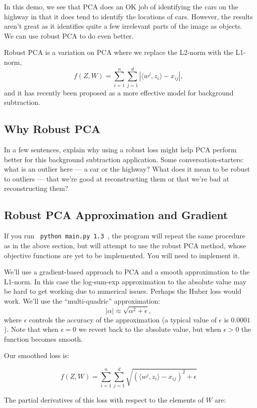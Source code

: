 \documentclass{article}
\newcommand{\blu}[1]{{\textcolor{blu}{#1}}}
\let\ask\blu
\begin{document}
In this demo, we see that PCA does an OK job of identifying the cars on the highway in that it does tend to identify the locations of cars. However, the results aren't great as it identifies quite a few irrelevant parts of the image as objects. We can use robust PCA to do even better.

Robust PCA is a variation on PCA where we replace the L2-norm with the L1-norm,
\[
f(Z,W) = \sum_{i=1}^n\sum_{j=1}^d |\langle w^j, z_i\rangle - x_{ij}|,
\]
and it has recently been proposed as a more effective model for background subtraction.

\subsection{Why Robust PCA}

\ask{In a few sentences, explain why using a robust loss might help PCA perform better for this background subtraction application.} Some conversation-starters: what is an outlier here --- a car or the highway? What does it mean to be robust to outliers --- that we're good at reconstructing them or that we're bad at reconstructing them?

\subsection{Robust PCA Approximation and Gradient}

If you run \verb| python main.py 1.3 |, the program will repeat the same procedure as in the above section, but will attempt to use the robust PCA method, whose objective functions are yet to be implemented. You will need to implement it.

We'll use a gradient-based approach to PCA and a smooth approximation to the L1-norm. In this case the log-sum-exp approximation to the absolute value may be hard to get working due to numerical issues. Perhaps the Huber loss would work. We'll use the ``multi-quadric'' approximation:
\[
|\alpha| \approx \sqrt{\alpha^2 + \epsilon},
\]
where $\epsilon$ controls the accuracy of the approximation (a typical value of $\epsilon$ is $0.0001$). Note that when $\epsilon=0$ we revert back to the absolute value, but when $\epsilon>0$ the function becomes smooth.

Our smoothed loss is:

\[
f(Z,W) = \sum_{i=1}^n\sum_{j=1}^d \sqrt{(\langle w^j, z_i\rangle - x_{ij})^2 + \epsilon }
\]

The partial derivatives of this loss with respect to the elements of $W$ are:
\end{document}
